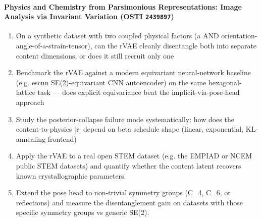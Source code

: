\documentclass[11pt]{article}
\begin{document}
\paragraph{Physics and Chemistry from Parsimonious Representations: Image Analysis via Invariant Variation \textnormal{\small(OSTI \texttt{2439897})}}
\begin{enumerate}[leftmargin=1.6em,itemsep=0.2em,topsep=0.2em,label=Q\arabic*.]
\item On a synthetic dataset with two coupled physical factors (a AND orientation-angle-of-a-strain-tensor), can the rVAE cleanly disentangle both into separate content dimensions, or does it still recruit only one
\item Benchmark the rVAE against a modern equivariant neural-network baseline (e.g. escnn SE(2)-equivariant CNN autoencoder) on the same hexagonal-lattice task --- does explicit equivariance beat the implicit-via-pose-head approach
\item Study the posterior-collapse failure mode systematically: how does the content-to-physics |r| depend on beta schedule shape (linear, exponential, KL-annealing frontend)
\item Apply the rVAE to a real open STEM dataset (e.g. the EMPIAD or NCEM public STEM datasets) and quantify whether the content latent recovers known crystallographic parameters.
\item Extend the pose head to non-trivial symmetry groups (C\_4, C\_6, or reflections) and measure the disentanglement gain on datasets with those specific symmetry groups vs generic SE(2).
\end{enumerate}
\end{document}
